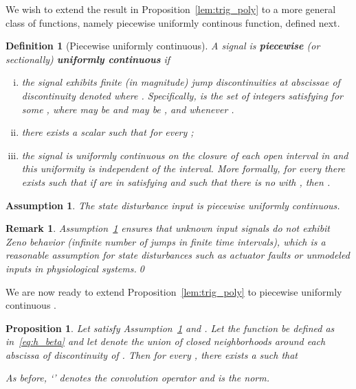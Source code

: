 \documentclass[times, doublespace]{rncauth}
\newtheorem{prop}{Proposition}
\newtheorem{definition}{Definition}
\newtheorem{assumption}{Assumption}
\newtheorem{remark}{Remark}
\begin{document}
We wish to extend the result in Proposition~\ref{lem:trig_poly} to a more general class of functions, namely piecewise uniformly continous function, defined next.
\begin{definition}[Piecewise uniformly continuous]
	\label{def:pw_cont}
	A signal  is \textbf{piecewise} (or sectionally) \textbf{uniformly continuous} if
	\begin{enumerate}[(i)]
		\item the signal  exhibits finite (in magnitude) jump discontinuities at abscissae of discontinuity denoted  where . Specifically,  is the set of integers  satisfying  for some , where  may be  and  may be , and  whenever .
		\item there exists a scalar  such that 
		for every ;
		\item the signal  is uniformly continuous on the closure of each open interval in  and this uniformity is independent of the interval.  More formally, for every  there exists  such that if  are in  satisfying  and such that there is no  with , then .
	\end{enumerate}
\end{definition}
\begin{assumption}\label{ass:unif_cont_uio}
	The state disturbance input  is piecewise uniformly continuous.
\end{assumption}
\begin{remark}
	Assumption~\ref{ass:unif_cont_uio} ensures that unknown input signals do not exhibit Zeno behavior (infinite number of jumps in finite time intervals), which is a reasonable assumption for state disturbances such as actuator faults or unmodeled inputs in physiological systems.\qed
	\end{remark}

We are now ready to extend Proposition~\ref{lem:trig_poly} to piecewise uniformly continuous .

\begin{prop}\label{prop:filt_pw_cont}
	Let  satisfy Assumption~\ref{ass:unif_cont_uio} and . Let the function  be defined as in~\eqref{eq:h_beta} and let 
	denote the union of closed neighborhoods around each abscissa of discontinuity of .  Then for every , there exists a  such that
	
	As before, `' denotes the convolution operator and  is the  norm.
\end{prop}
\end{document}
